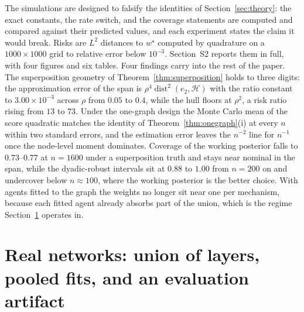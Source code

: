\documentclass[12pt]{article}
\newcommand{\calH}{\mathcal{H}}
\newcommand{\dist}{\operatorname{dist}}
\newcommand{\wstar}{w^{\star}}
\begin{document}
The simulations are designed to falsify the identities of Section~\ref{sec:theory}: the exact constants, the rate switch, and the coverage statements are computed and compared against their predicted values, and each experiment states the claim it would break. Risks are $L^2$ distances to $\wstar$ computed by quadrature on a $1000\times1000$ grid to relative error below $10^{-3}$. Section~S2 reports them in full, with four figures and six tables. Four findings carry into the rest of the paper. The superposition geometry of Theorem~\ref{thm:superposition} holds to three digits: the approximation error of the span is $\rho^4\dist^2(e_2,\calH)$ with the ratio constant to $3.00\times10^{-3}$ across $\rho$ from $0.05$ to $0.4$, while the hull floors at $\rho^2$, a risk ratio rising from $13$ to $73$. Under the one-graph design the Monte Carlo mean of the score quadratic matches the identity of Theorem~\ref{thm:onegraph}(i) at every $n$ within two standard errors, and the estimation error leaves the $n^{-2}$ line for $n^{-1}$ once the node-level moment dominates. Coverage of the working posterior falls to $0.73$--$0.77$ at $n=1600$ under a superposition truth and stays near nominal in the span, while the dyadic-robust intervals sit at $0.88$ to $1.00$ from $n=200$ on and undercover below $n\approx100$, where the working posterior is the better choice. With agents fitted to the graph the weights no longer sit near one per mechanism, because each fitted agent already absorbs part of the union, which is the regime Section~\ref{sec:real} operates in.

\section{Real networks: union of layers, pooled fits, and an evaluation artifact}
\label{sec:real}
\end{document}
